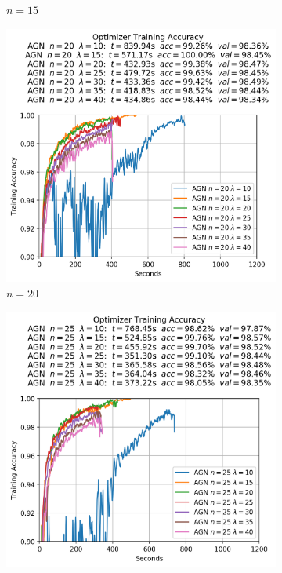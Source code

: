 \begin{figure}
\begin{subfigure}{.3\textwidth}
    \caption{$n = 15$}
  \end{subfigure}
  \begin{subfigure}{.3\textwidth}
    \centering
    \includegraphics[width=\linewidth]{resources/images/agn_experiments_workers_20}
    \caption{$n = 20$}
  \end{subfigure}
  \begin{subfigure}{.3\textwidth}
    \centering
    \includegraphics[width=\linewidth]{resources/images/agn_experiments_workers_25}

\end{subfigure}
\end{figure}
